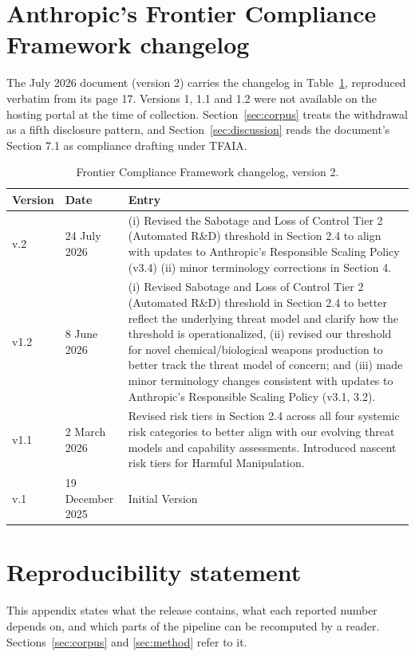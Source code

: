 \documentclass{article}
\begin{document}
\clearpage
\section{Anthropic's Frontier Compliance Framework changelog}
\label{apx:fcf}
The July 2026 document (version 2) carries the changelog in Table~\ref{tab:fcf}, reproduced verbatim from its page 17. Versions 1, 1.1 and 1.2 were not available on the hosting portal at the time of collection. Section~\ref{sec:corpus} treats the withdrawal as a fifth disclosure pattern, and Section~\ref{sec:discussion} reads the document's Section 7.1 as compliance drafting under TFAIA.
\begin{table}[H]\centering\small
\caption{Frontier Compliance Framework changelog, version 2.}
\label{tab:fcf}
\begin{tabular}{llp{9cm}}
\toprule Version & Date & Entry \\ \midrule
v.2 & 24 July 2026 & (i) Revised the Sabotage and Loss of Control Tier 2 (Automated R\&D) threshold in Section 2.4 to align with updates to Anthropic's Responsible Scaling Policy (v3.4) (ii) minor terminology corrections in Section 4. \\
v1.2 & 8 June 2026 & (i) Revised Sabotage and Loss of Control Tier 2 (Automated R\&D) threshold in Section 2.4 to better reflect the underlying threat model and clarify how the threshold is operationalized, (ii) revised our threshold for novel chemical/biological weapons production to better track the threat model of concern; and (iii) made minor terminology changes consistent with updates to Anthropic's Responsible Scaling Policy (v3.1, 3.2). \\
v1.1 & 2 March 2026 & Revised risk tiers in Section 2.4 across all four systemic risk categories to better align with our evolving threat models and capability assessments. Introduced nascent risk tiers for Harmful Manipulation. \\
v.1 & 19 December 2025 & Initial Version \\
\bottomrule
\end{tabular}
\end{table}

\clearpage
\section{Reproducibility statement}
\label{apx:repro}
This appendix states what the release contains, what each reported number depends on, and which parts of the pipeline can be recomputed by a reader. Sections~\ref{sec:corpus} and \ref{sec:method} refer to it.
\end{document}
